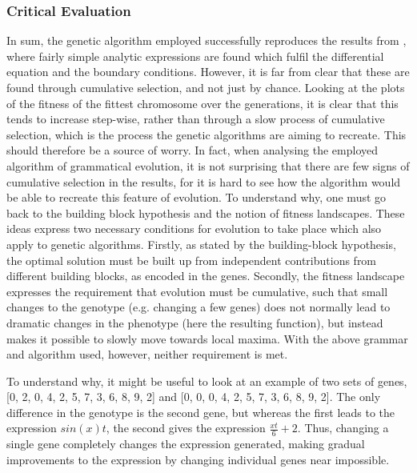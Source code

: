 \documentclass[multicolumn, 9pt]{extarticle}
\begin{document}
\subsubsection{Critical Evaluation}
In sum, the genetic algorithm employed successfully reproduces the results from \cite{Lagaris}, where fairly simple analytic expressions are found which fulfil the differential equation and the boundary conditions. However, it is far from clear that these are found through cumulative selection, and not just by chance. Looking at the plots of the fitness of the fittest chromosome over the generations, it is clear that this tends to increase step-wise, rather than through a slow process of cumulative selection, which is the process the genetic algorithms are aiming to recreate. This should therefore be a source of worry. In fact, when analysing the employed algorithm of grammatical evolution, it is not surprising that there are few signs of cumulative selection in the results, for it is hard to see how the algorithm would be able to recreate this feature of evolution. To understand why, one must go back to the building block hypothesis and the notion of fitness landscapes. These ideas express two necessary conditions for evolution to take place which also apply to genetic algorithms. Firstly, as stated by the building-block hypothesis, the optimal solution must be built up from independent contributions from different building blocks, as encoded in the genes. Secondly, the fitness landscape expresses the requirement that evolution must be cumulative, such that small changes to the genotype (e.g. changing a few genes) does not normally lead to dramatic changes in the phenotype (here the resulting function), but instead makes it possible to slowly move towards local maxima. With the above grammar and algorithm used, however, neither requirement is met.

To understand why, it might be useful to look at an example of two sets of genes, [0, 2, 0, 4, 2, 5, 7, 3, 6, 8, 9, 2] and [0, 0, 0, 4, 2, 5, 7, 3, 6, 8, 9, 2]. The only difference in the genotype is the second gene, but whereas the first leads to the expression $sin(x)t$, the second gives the expression $\frac{xt}{6} + 2$. Thus, changing a single gene completely changes the expression generated, making gradual improvements to the expression by changing individual genes near impossible.
\end{document}
